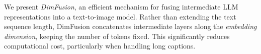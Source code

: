 




We present \emph{DimFusion}, an efficient mechanism for fusing intermediate LLM representations into a text-to-image model. Rather than extending the text sequence length, DimFusion concatenates intermediate layers along the \emph{embedding dimension}, keeping the number of tokens fixed. This significantly reduces computational cost, particularly when handling long captions. 



